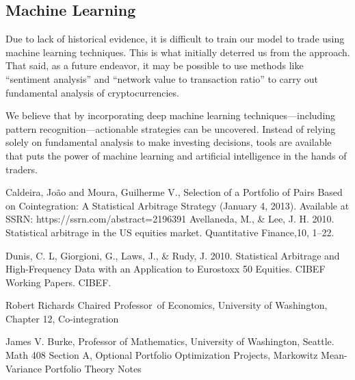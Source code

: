 \documentclass[12pt, letterpaper]{article}
\begin{document}
	\subsection{Machine Learning}
	Due to lack of historical evidence, it is difficult to train our model to trade using machine learning techniques. This is what initially deterred us from the approach. That said, as a future endeavor, it may be possible to use methods like ``sentiment analysis'' and ``network value to transaction ratio'' to carry out fundamental analysis of cryptocurrencies.
	
	We believe that by incorporating deep machine learning techniques---including pattern recognition---actionable strategies can be uncovered. Instead of relying solely on fundamental analysis to make investing decisions, tools are available that puts the power of machine learning and artificial intelligence in the hands of traders.


\begin{thebibliography}{5}
	Caldeira, João and Moura, Guilherme V., Selection of a Portfolio of Pairs Based on Cointegration: A Statistical Arbitrage Strategy (January 4, 2013). Available at SSRN: https://ssrn.com/abstract=2196391
	Avellaneda, M., \& Lee, J. H. 2010. Statistical arbitrage in the US equities market. Quantitative Finance,10, 1–22.

	Dunis, C. L, Giorgioni, G., Laws, J., \& Rudy, J. 2010. Statistical Arbitrage and High-Frequency Data with an Application to Eurostoxx 50 Equities. CIBEF Working Papers. CIBEF.

	Robert Richards Chaired Professor of Economics, University of Washington, Chapter 12, Co-integration

	James V. Burke, Professor of Mathematics, University of Washington, Seattle. Math 408 Section A, Optional Portfolio Optimization Projects, Markowitz Mean-Variance Portfolio Theory Notes
\end{thebibliography}
\end{document}
